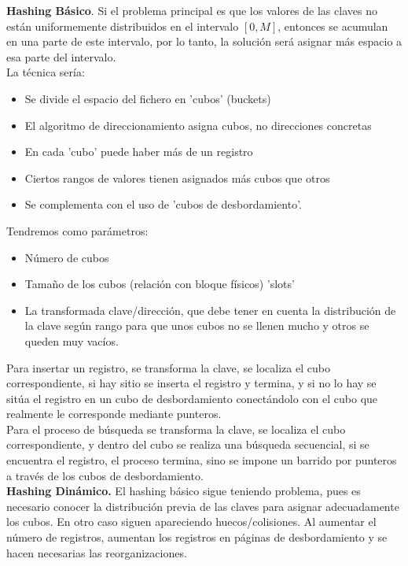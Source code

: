 \documentclass[a4paper,11pt]{article}
\begin{document}
\textbf{Hashing Básico}. Si el problema principal es que los valores de las claves no están uniformemente distribuidos en el intervalo $[0,M]$, entonces se acumulan en una parte de este intervalo, por lo tanto, la solución será asignar más espacio a esa parte del intervalo. \\

La técnica sería:

\begin{itemize}
\item Se divide el espacio del fichero en 'cubos' (buckets)
\item El algoritmo de direccionamiento asigna cubos, no direcciones concretas
\item En cada 'cubo' puede haber más de un registro
\item Ciertos rangos de valores tienen asignados más cubos que otros
\item Se complementa con el uso de 'cubos de desbordamiento'.
\end{itemize}

Tendremos como parámetros:

\begin{itemize}
\item Número de cubos
\item Tamaño de los cubos (relación con bloque físicos) 'slots'
\item La transformada clave/dirección, que debe tener en cuenta la distribución de la clave según rango para que unos cubos no se llenen mucho y otros se queden muy vacíos.
\end{itemize}

Para insertar un registro, se transforma la clave, se localiza el cubo correspondiente, si hay sitio se inserta el registro y termina, y si no lo hay se sitúa el registro en un cubo de desbordamiento conectándolo con el cubo que realmente le corresponde mediante punteros. \\

Para el proceso de búsqueda se transforma la clave, se localiza el cubo correspondiente, y dentro del cubo se realiza una búsqueda secuencial, si se encuentra el registro, el proceso termina, sino se impone un barrido por punteros a través de los cubos de desbordamiento. \\

\textbf{Hashing Dinámico.} El hashing básico sigue teniendo problema, pues es necesario conocer la distribución previa de las claves para asignar adecuadamente los cubos. En otro caso siguen apareciendo huecos/colisiones. Al aumentar el número de registros, aumentan los registros en páginas de desbordamiento y se hacen necesarias las reorganizaciones. \\
\end{document}
